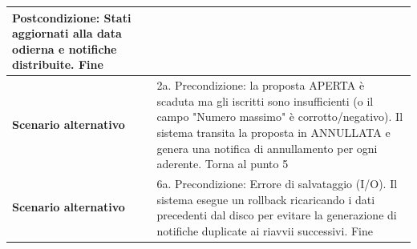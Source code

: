 \documentclass[12pt, a4paper, oneside]{report}
\begin{document}
\begin{tabularx}{\textwidth}{|l|X|}
    Postcondizione: Stati aggiornati alla data odierna e notifiche distribuite.\newline
    Fine \\ \hline
    \textbf{Scenario alternativo} & 
    2a. Precondizione: la proposta APERTA è scaduta ma gli iscritti sono insufficienti (o il campo "Numero massimo" è corrotto/negativo).\newline
    Il sistema transita la proposta in ANNULLATA e genera una notifica di annullamento per ogni aderente.\newline
    Torna al punto 5 \\ \hline
    \textbf{Scenario alternativo} & 
    6a. Precondizione: Errore di salvataggio (I/O).\newline
    Il sistema esegue un rollback ricaricando i dati precedenti dal disco per evitare la generazione di notifiche duplicate ai riavvii successivi.\newline
    Fine \\ \hline
\end{tabularx}

\renewcommand{\arraystretch}{1.4} 
\end{document}
